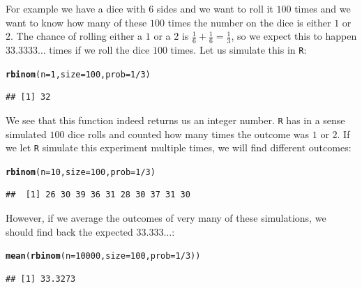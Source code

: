 \documentclass{article}\usepackage[]{graphicx}\usepackage[]{color}
\makeatletter
\newcommand{\hlnum}[1]{\textcolor[rgb]{0.686,0.059,0.569}{#1}}%
\newcommand{\hlopt}[1]{\textcolor[rgb]{0,0,0}{#1}}%
\newcommand{\hlstd}[1]{\textcolor[rgb]{0.345,0.345,0.345}{#1}}%
\newcommand{\hlkwc}[1]{\textcolor[rgb]{0.333,0.667,0.333}{#1}}%
\newcommand{\hlkwd}[1]{\textcolor[rgb]{0.737,0.353,0.396}{\textbf{#1}}}%
\newenvironment{kframe}{%
 \def\at@end@of@kframe{}%
 \ifinner\ifhmode%
  \def\at@end@of@kframe{\end{minipage}}%
  \begin{minipage}{\columnwidth}%
 \fi\fi%
 \def\FrameCommand##1{\hskip\@totalleftmargin \hskip-\fboxsep
 \colorbox{shadecolor}{##1}\hskip-\fboxsep
     \hskip-\linewidth \hskip-\@totalleftmargin \hskip\columnwidth}%
 \MakeFramed {\advance\hsize-\width
   \@totalleftmargin\z@ \linewidth\hsize
   \@setminipage}}%
 {\par\unskip\endMakeFramed%
 \at@end@of@kframe}
\newenvironment{knitrout}{}{} %
\makeatother
\begin{document}
For example we have a dice with 6 sides and we want to roll it $100$ times and we want to know how many of these $100$ times the number on the dice is either $1$ or $2$. The chance of rolling either a $1$ or a $2$ is $\frac{1}{6}+\frac{1}{6}=\frac{1}{3}$, so we expect this to happen $33.3333\dots$ times if we roll the dice $100$ times. Let us simulate this in \texttt{R}:
\begin{knitrout}
\color{fgcolor}\begin{kframe}
\begin{alltt}
\hlkwd{rbinom}\hlstd{(}\hlkwc{n}\hlstd{=}\hlnum{1}\hlstd{,}\hlkwc{size}\hlstd{=}\hlnum{100}\hlstd{,}\hlkwc{prob}\hlstd{=}\hlnum{1}\hlopt{/}\hlnum{3}\hlstd{)}
\end{alltt}
\begin{verbatim}
## [1] 32
\end{verbatim}
\end{kframe}
\end{knitrout}
We see that this function indeed returns us an integer number. \texttt{R} has in a sense simulated $100$ dice rolls and counted how many times the outcome was $1$ or $2$. If we let \texttt{R} simulate this experiment multiple times, we will find different outcomes:
\begin{knitrout}
\color{fgcolor}\begin{kframe}
\begin{alltt}
\hlkwd{rbinom}\hlstd{(}\hlkwc{n}\hlstd{=}\hlnum{10}\hlstd{,}\hlkwc{size}\hlstd{=}\hlnum{100}\hlstd{,}\hlkwc{prob}\hlstd{=}\hlnum{1}\hlopt{/}\hlnum{3}\hlstd{)}
\end{alltt}
\begin{verbatim}
##  [1] 26 30 39 36 31 28 30 37 31 30
\end{verbatim}
\end{kframe}
\end{knitrout}
However, if we average the outcomes of very many of these simulations, we should find back the expected $33.333\dots$:
\begin{knitrout}
\color{fgcolor}\begin{kframe}
\begin{alltt}
\hlkwd{mean}\hlstd{(}\hlkwd{rbinom}\hlstd{(}\hlkwc{n}\hlstd{=}\hlnum{10000}\hlstd{,}\hlkwc{size}\hlstd{=}\hlnum{100}\hlstd{,}\hlkwc{prob}\hlstd{=}\hlnum{1}\hlopt{/}\hlnum{3}\hlstd{))}
\end{alltt}
\begin{verbatim}
## [1] 33.3273
\end{verbatim}
\end{kframe}
\end{knitrout}
\end{document}
